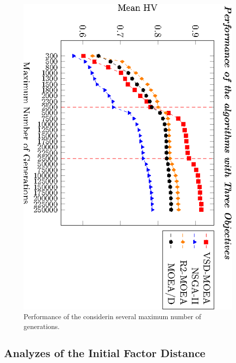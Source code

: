 \begin{figure}[t]
\includegraphics[angle=90,origin=c]{Images/Graphic-Performance-Time_tikz-figure1.eps}
\caption{Performance of the \MOEAS{} considerin several maximum number of generations.}\label{fig:Performance_time}
\end{figure}

\subsection{Analyzes of the Initial Factor Distance}

